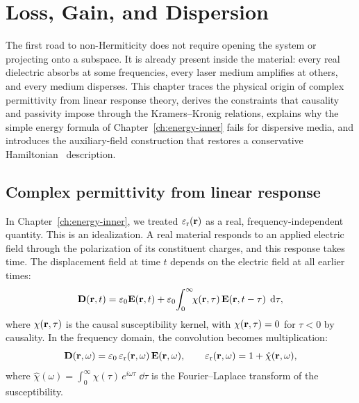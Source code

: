 \chapter{Loss, Gain, and Dispersion}
\label{ch:loss-gain-dispersion}

\begin{chapterlead}
The first road to non-Hermiticity does not require opening the system or
projecting onto a subspace. It is already present inside the material:
every real dielectric absorbs at some frequencies, every laser medium
amplifies at others, and every medium disperses. This chapter traces the
physical origin of complex permittivity from linear response theory,
derives the constraints that causality and passivity impose through the
Kramers--Kronig relations, explains why the simple energy formula of
Chapter~\ref{ch:energy-inner} fails for dispersive media, and introduces
the auxiliary-field construction that restores a conservative Hamiltonian~\cite{raman2010photonic}
description.
\end{chapterlead}


\section{Complex permittivity from linear response}
\label{sec:complex-eps}

In Chapter~\ref{ch:energy-inner}, we treated $\varepsilon_{\mathrm{r}}(\mathbf{r})$ as a real,
frequency-independent quantity. This is an idealization. A real material
responds to an applied electric field through the polarization of its
constituent charges, and this response takes time. The displacement field
at time $t$ depends on the electric field at all earlier times:
\begin{equation}
 \mathbf{D}(\mathbf{r},t) = \varepsilon_0\mathbf{E}(\mathbf{r},t)
 + \varepsilon_0\!\int_0^\infty\!\!\chi(\mathbf{r},\tau)\,\mathbf{E}(\mathbf{r},t-\tau)\;\mathop{}\!\mathrm{d}\tau,
 \label{eq:convolution}
\end{equation}
where $\chi(\mathbf{r},\tau)$ is the causal susceptibility kernel, with
$\chi(\mathbf{r},\tau) = 0$ for $\tau < 0$ by causality. In the frequency
domain, the convolution becomes multiplication:
\begin{equation}
 \mathbf{D}(\mathbf{r},\omega) = \varepsilon_0\,\varepsilon_{\mathrm{r}}(\mathbf{r},\omega)\,\mathbf{E}(\mathbf{r},\omega),
 \qquad
 \varepsilon_{\mathrm{r}}(\mathbf{r},\omega) = 1 + \hat{\chi}(\mathbf{r},\omega),
 \label{eq:eps-freq}
\end{equation}
where $\hat{\chi}(\omega) = \int_0^\infty \chi(\tau)\,e^{i\omega\tau}\;\dd\tau$
is the Fourier--Laplace transform of the susceptibility.

